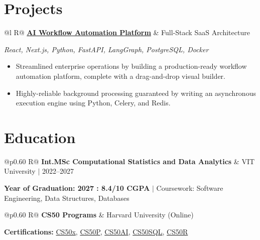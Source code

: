 \documentclass[a4paper,10pt]{article}
\newcommand{\ulink}[2]{\href{#1}{#2}}
\newcommand{\subheading}[1]{{\color[HTML]{0A0A0A}\fontsize{12}{14}\selectfont\bfseries #1}}
\newcommand{\techstack}[1]{{\color[HTML]{5C5C5C}\fontsize{10.5}{12.5}\selectfont\itshape #1}}
\newcommand{\meta}[1]{{\color[HTML]{5C5C5C}\fontsize{10.5}{12.5}\selectfont #1}}
\begin{document}
\section{Projects}
\vspace{2pt}

\begin{tabularx}{\linewidth}{@{}l R@{}}
\subheading{\ulink{https://github.com/su-jin1425/AI-Workflow-Automation-Platform}{AI Workflow Automation Platform}} & \meta{Full-Stack SaaS Architecture}
\end{tabularx}
\techstack{React, Next.js, Python, FastAPI, LangGraph, PostgreSQL, Docker}
\begin{itemize}[nosep, leftmargin=1.5em, itemsep=2pt, topsep=2pt]
  \item {\color[HTML]{0A0A0A}\fontsize{11}{14}\selectfont Streamlined enterprise operations by building a production-ready workflow automation platform, complete with a drag-and-drop visual builder.}
  \item {\color[HTML]{0A0A0A}\fontsize{11}{14}\selectfont Highly-reliable background processing guaranteed by writing an asynchronous execution engine using Python, Celery, and Redis.}
\end{itemize}

\section{Education}
\vspace{2pt}

\begin{tabularx}{\linewidth}{@{}p{0.60\linewidth} R@{}}
\subheading{Int.MSc Computational Statistics and Data Analytics} & \meta{VIT University $|$ 2022--2027}
\end{tabularx}
{\color[HTML]{3A3A3A}\fontsize{11}{14}\selectfont \textbf{Year of Graduation: 2027 : 8.4/10 CGPA} $|$ Coursework: Software Engineering, Data Structures, Databases}

\begin{tabularx}{\linewidth}{@{}p{0.60\linewidth} R@{}}
\subheading{CS50 Programs} & \meta{Harvard University (Online)}
\end{tabularx}
{\color[HTML]{3A3A3A}\fontsize{11}{14}\selectfont \textbf{Certifications:} \ulink{https://cs50.harvard.edu/certificates/b14b78df-e05c-413e-a607-1dd27303053a}{CS50x}, \ulink{https://cs50.harvard.edu/certificates/32477052-9db4-49c4-a5a4-d7e58429ca2c}{CS50P}, \ulink{https://cs50.harvard.edu/certificates/9cdb4d4a-1250-4f8e-9fd7-191864e0f919}{CS50AI}, \ulink{https://cs50.harvard.edu/certificates/bc486f24-f085-4e61-8536-80940b97a1b9}{CS50SQL}, \ulink{https://cs50.harvard.edu/certificates/666838e6-a053-4d82-b179-a60fe745fd84}{CS50R}}
\end{document}
